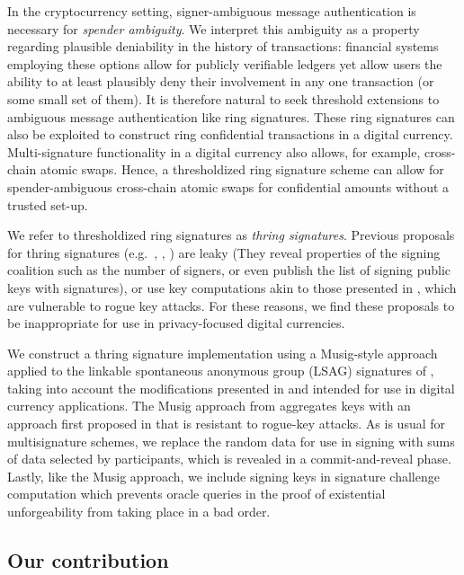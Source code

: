 \documentclass{mrl}
\theoremstyle{definition}
\numberwithin{theorem}{subsection}
\begin{document}
In the cryptocurrency setting, signer-ambiguous message authentication is necessary for \textit{spender ambiguity}. We interpret this ambiguity as a property regarding plausible deniability in the history of transactions: financial systems employing these options allow for publicly verifiable ledgers yet allow users the ability to at least plausibly deny their involvement in any one transaction (or some small set of them). It is therefore natural to seek threshold extensions to ambiguous message authentication like ring signatures. These ring signatures can also be exploited to construct ring confidential transactions in a digital currency. Multi-signature functionality in a digital currency also allows, for example, cross-chain atomic swaps. Hence, a thresholdized ring signature scheme can allow for spender-ambiguous cross-chain atomic swaps for confidential amounts without a trusted set-up.

We refer to thresholdized ring signatures as \textit{thring signatures}. Previous proposals for thring signatures (e.g.\ \cite{bresson2002threshold}, \cite{liu2003separable}, \cite{tsang2004separable}) are leaky (They reveal properties of the signing coalition such as the number of signers, or even publish the list of signing public keys with signatures), or use key computations akin to those presented in \cite{bellare2006multi}, which are vulnerable to rogue key attacks. For these reasons, we find these proposals to be inappropriate for use in privacy-focused digital currencies.

We construct a thring signature implementation using a Musig-style approach applied to the linkable spontaneous anonymous group (LSAG) signatures of \cite{liu2004linkable}, taking into account the modifications presented in \cite{backLSAG} and \cite{noether2016ring} intended for use in digital currency applications. The Musig approach from \cite{maxwell2018simple} aggregates keys with an approach first proposed in \cite{qian2010non} that is resistant to rogue-key attacks. As is usual for multisignature schemes, we replace the random data for use in signing with sums of data selected by participants, which is revealed in a commit-and-reveal phase. Lastly, like the Musig approach, we include signing keys in signature challenge computation which prevents oracle queries in the proof of existential unforgeability from taking place in a bad order. 


\subsection{Our contribution}
\end{document}
